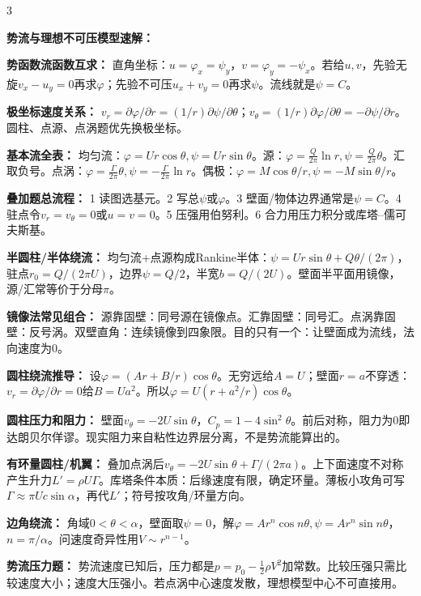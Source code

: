 \documentclass[a4paper]{article}
\newcommand{\sect}[1]{\par{\bfseries\color{Q}#1：}}
\begin{document}
\begin{multicols}{3}
{\sect{势流与理想不可压模型速解}
\sect{势函数流函数互求}
直角坐标：$u=\varphi_x=\psi_y$，$v=\varphi_y=-\psi_x$。若给$u,v$，先验无旋$v_x-u_y=0$再求$\varphi$；先验不可压$u_x+v_y=0$再求$\psi$。流线就是$\psi=C$。
\sect{极坐标速度关系}
$v_r=\partial\varphi/\partial r=(1/r)\partial\psi/\partial\theta$；$v_\theta=(1/r)\partial\varphi/\partial\theta=-\partial\psi/\partial r$。圆柱、点源、点涡题优先换极坐标。
\sect{基本流全表}
均匀流：$\varphi=Ur\cos\theta,\psi=Ur\sin\theta$。源：$\varphi=\frac Q{2\pi}\ln r,\psi=\frac Q{2\pi}\theta$。汇取负号。点涡：$\varphi=\frac\Gamma{2\pi}\theta,\psi=-\frac\Gamma{2\pi}\ln r$。偶极：$\varphi=M\cos\theta/r,\psi=-M\sin\theta/r$。
\sect{叠加题总流程}
1 读图选基元。2 写总$\psi$或$\varphi$。3 壁面/物体边界通常是$\psi=C$。4 驻点令$v_r=v_\theta=0$或$u=v=0$。5 压强用伯努利。6 合力用压力积分或库塔--儒可夫斯基。
\sect{半圆柱/半体绕流}
均匀流+点源构成Rankine半体：$\psi=Ur\sin\theta+Q\theta/(2\pi)$，驻点$r_0=Q/(2\pi U)$，边界$\psi=Q/2$，半宽$b=Q/(2U)$。壁面半平面用镜像，源/汇常等价于分母$\pi$。
\sect{镜像法常见组合}
源靠固壁：同号源在镜像点。汇靠固壁：同号汇。点涡靠固壁：反号涡。双壁直角：连续镜像到四象限。目的只有一个：让壁面成为流线，法向速度为0。
\sect{圆柱绕流推导}
设$\varphi=(Ar+B/r)\cos\theta$。无穷远给$A=U$；壁面$r=a$不穿透：$v_r=\partial\varphi/\partial r=0$给$B=Ua^2$。所以$\varphi=U(r+a^2/r)\cos\theta$。
\sect{圆柱压力和阻力}
壁面$v_\theta=-2U\sin\theta$，$C_p=1-4\sin^2\theta$。前后对称，阻力为0即达朗贝尔佯谬。现实阻力来自粘性边界层分离，不是势流能算出的。
\sect{有环量圆柱/机翼}
叠加点涡后$v_\theta=-2U\sin\theta+\Gamma/(2\pi a)$。上下面速度不对称产生升力$L'=\rho U\Gamma$。库塔条件本质：后缘速度有限，确定环量。薄板小攻角可写$\Gamma\approx\pi Uc\sin\alpha$，再代$L'$；符号按攻角/环量方向。
\sect{边角绕流}
角域$0<\theta<\alpha$，壁面取$\psi=0$，解$\varphi=Ar^n\cos n\theta,\psi=Ar^n\sin n\theta$，$n=\pi/\alpha$。问速度奇异性用$V\sim r^{n-1}$。
\sect{势流压力题}
势流速度已知后，压力都是$p=p_0-\frac12\rho V^2$加常数。比较压强只需比较速度大小；速度大压强小。若点涡中心速度发散，理想模型中心不可直接用。

}
\end{multicols}
\end{document}
